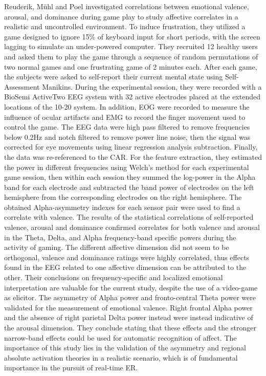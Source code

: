 Reuderik, Mühl and Poel \cite{reuderink_valence_2013} investigated correlations between emotional valence, arousal, and dominance during game play to study affective correlates in a realistic and uncontrolled environment. To induce frustration, they utilized a game designed to ignore 15\% of keyboard input for short periods, with the screen lagging to simulate an under-powered computer. They recruited 12 healthy users and asked them to play the game through a sequence of random permutations of two normal games and one frustrating game of 2 minutes each. After each game, the subjects were asked to self-report their current mental state using Self-Assessment Manikins. During the experimental session, they were recorded with a BioSemi ActiveTwo EEG system with 32 active electrodes placed at the extended locations of the 10-20 system. In addition, \ac{EOG} were recorded to measure the influence of ocular artifacts and \ac{EMG} to record the finger movement used to control the game. The \ac{EEG} data were high pass filtered to remove frequencies below 0.2Hz and notch filtered to remove power line noise, then the signal was corrected for eye movements using linear regression analysis subtraction. Finally, the data was re-referenced to the \ac{CAR}. For the feature extraction, they estimated the power in different frequencies using Welch’s method for each experimental game session, then within each session they summed the log-power in the Alpha band for each electrode and subtracted the band power of electrodes on the left hemisphere from the corresponding electrodes on the right hemisphere. The obtained Alpha-asymmetry indexes for each sensor pair were used to find a correlate with valence. The results of the statistical correlations of self-reported valence, arousal and dominance confirmed correlates for both valence and arousal in the Theta, Delta, and Alpha frequency-band specific powers during the activity of gaming. The different affective dimension did not seem to be orthogonal, valence and dominance ratings were highly correlated, thus effects found in the \ac{EEG} related to one affective dimension can be attributed to the other. Their conclusions on frequency-specific and localized emotional interpretation are valuable for the current study, despite the use of a video-game as elicitor. The asymmetry of Alpha power and fronto-central Theta power were validated for the measurement of emotional valence. Right frontal Alpha power and the absence of right parietal Delta power instead were instead indicative of the arousal dimension. They conclude stating that these effects and the stronger narrow-band effects could be used for automatic recognition of affect. The importance of this study lies in the validation of the asymmetry and regional absolute activation theories in a realistic scenario, which is of fundamental importance in the pursuit of real-time \ac{ER}.
